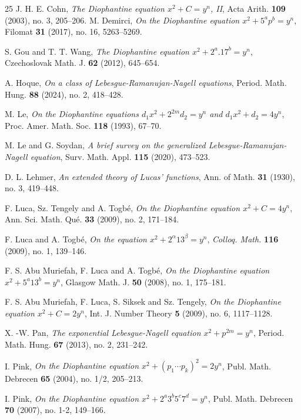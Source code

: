 \documentclass[12pt, 14paper,reqno]{amsart}
\theoremstyle{plain}
\theoremstyle{proof}
\numberwithin{equation}{section}
\begin{document}
\begin{thebibliography}{25}
 J. H. E. Cohn, {\it The Diophantine equation $x^2 + C = y^n$, II}, Acta Arith. {\bf 109} (2003), no. 3,  205--206.
 M. Demirci, {\it On the Diophantine equation $x^2 + 5^a p^b = y^n$}, Filomat {\bf 31} (2017), no. 16, 5263--5269.

 S. Gou and T. T. Wang, {\it The Diophantine equation $x^2 + 2^a.17^b = y^n$}, Czechoslovak Math. J. {\bf 62} (2012), 645--654.

 A. Hoque, {\it On a class of Lebesgue-Ramanujan-Nagell equations}, Period. Math. Hung. {\bf 88} (2024), no. 2, 418--428.


 M. Le, {\it On the Diophantine equations $d_1x^2+2^{2m}d_2=y^n$ and $d_1x^2+d_2=4y^n$}, Proc. Amer. Math. Soc. {\bf 118} (1993), 67--70.

 M. Le and G. Soydan, {\it A brief survey on the generalized Lebesgue-Ramanujan-Nagell equation}, Surv. Math. Appl. {\bf 115} (2020), 473--523.

 D. L. Lehmer, {\it  An extended theory of Lucas' functions},  Ann. of Math.  {\bf 31} (1930), no. 3, 419--448.

 F. Luca, Sz. Tengely and A. Togb\'{e}, {\it On the Diophantine equation $x^2 +C = 4y^n$}, Ann. Sci. Math. Qu\'e. {\bf 33} (2009), no. 2, 171--184.

 F. Luca and A. Togb\'e, {\it On the equation $x^2 + 2^\alpha 13^\beta = y^n$}, {\it Colloq. Math.} {\bf 116} (2009), no. 1, 139--146.

 F. S. Abu Muriefah, F. Luca and A. Togb\'e, {\it  On the Diophantine equation $x^2 + 5^a 13^b = y^n$},  Glasgow Math. J. {\bf 50} (2008), no. 1, 175--181.

 F. S. Abu Muriefah, F. Luca, S. Siksek and Sz. Tengely,  {\it On the Diophantine equation $x^2 +C = 2y^n$}, Int. J. Number Theory {\bf 5} (2009), no. 6, 1117--1128.

 X. -W. Pan, {\it The exponential Lebesgue-Nagell equation $x^2+p^{2m} = y^n$}, Period. Math. Hung. {\bf 67} (2013), no. 2, 231--242.

 I. Pink, {\it On the Diophantine equation $x^2 + (p_1 \cdots p_k)^2 = 2y^n$}, Publ. Math. Debrecen {\bf 65} (2004), no. 1/2, 205--213.

 I. Pink, {\it On the Diophantine equation $x^2 + 2^a 3^b 5^c 7^d = y^n$}, Publ. Math. Debrecen {\bf 70} (2007), no. 1-2, 149--166.


\end{thebibliography}
\end{document}
